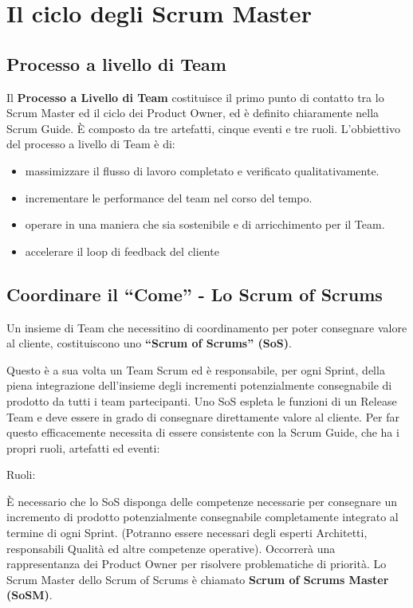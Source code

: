 \documentclass[12pt,a4paper,parskip=full]{scrartcl}
\begin{document}
\section{Il ciclo degli Scrum Master}
\subsection{Processo a livello di Team}
Il \textbf{Processo a Livello di Team} costituisce il primo punto di contatto tra lo Scrum Master ed il ciclo dei Product Owner, ed è definito chiaramente nella Scrum Guide. È composto da tre artefatti, cinque eventi e tre ruoli. L'obbiettivo del processo a livello di Team è di:
\begin{itemize}
\item massimizzare il flusso di lavoro completato e verificato qualitativamente.
\item incrementare le performance del team nel corso del tempo.
\item operare in una maniera che sia sostenibile e di arricchimento per il Team.
\item accelerare il loop di feedback del cliente
\end{itemize}

\subsection{Coordinare il ``Come'' - Lo Scrum of Scrums}
Un insieme di Team che necessitino di coordinamento per poter consegnare valore al cliente, costituiscono uno \textbf{``Scrum of Scrums'' (SoS)}.

Questo è a sua volta un Team Scrum ed è responsabile, per ogni Sprint, della piena integrazione dell'insieme degli incrementi potenzialmente consegnabile di prodotto da tutti i team partecipanti. Uno SoS espleta le funzioni di un Release Team e deve essere in grado di consegnare direttamente valore al cliente. Per far questo efficacemente necessita di essere consistente con la Scrum Guide, che ha i propri ruoli, artefatti ed eventi:

Ruoli:

È necessario che lo SoS disponga delle competenze necessarie per consegnare un incremento di prodotto potenzialmente consegnabile completamente integrato al termine di ogni Sprint. (Potranno essere necessari degli esperti Architetti, responsabili Qualità ed altre competenze operative). Occorrerà una rappresentanza dei Product Owner per risolvere problematiche di priorità. Lo Scrum Master dello Scrum of Scrums è chiamato \textbf{Scrum of Scrums Master (SoSM)}.
\end{document}
